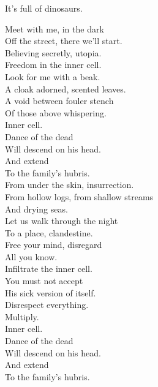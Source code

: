 It's full of dinosaurs. \\





Meet with me, in the dark \\
Off the street, there we'll start. \\
Believing secretly, utopia. \\
Freedom in the inner cell. \\

Look for me with a beak. \\
A cloak adorned, scented leaves. \\
A void between fouler stench \\
Of those above whispering. \\
Inner cell. \\

Dance of the dead \\
Will descend on his head. \\
And extend \\
To the family's hubris. \\

From under the skin, insurrection. \\
From hollow logs, from shallow streams \\
And drying seas. \\

Let us walk through the night \\
To a place, clandestine. \\
Free your mind, disregard \\
All you know. \\
Infiltrate the inner cell. \\

You must not accept \\
His sick version of  itself. \\
Disrespect everything. \\
Multiply. \\
Inner cell. \\

Dance of the dead \\
Will descend on his head. \\
And extend \\
To the family's hubris. \\

